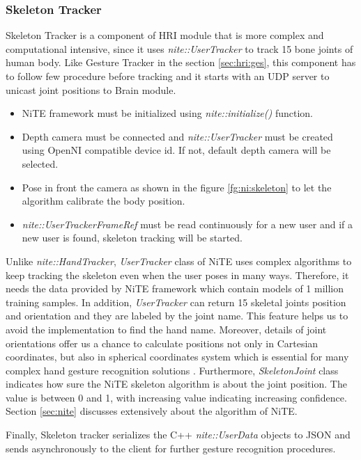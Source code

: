 \subsubsection{Skeleton Tracker} Skeleton Tracker is a component of HRI module that is more complex and computational intensive, since it uses \textit{nite::UserTracker} to track 15 bone joints of human body. Like Gesture Tracker in the section \ref{sec:hri:ges}, this component has to follow few procedure before tracking and it starts with an UDP server to unicast joint positions to Brain module. 
\begin{itemize}
	\item NiTE framework must be initialized using \textit{nite::initialize()} function. 
	\item Depth camera must be connected and \textit{nite::UserTracker} must be created using OpenNI compatible device id. If not, default depth camera will be selected. 
	\item Pose in front the camera as shown in the figure \ref{fg:ni:skeleton} to let the algorithm calibrate the body position. 
	\item \textit{nite::UserTrackerFrameRef }must be read continuously for a new user and if a new user is found, skeleton tracking will be started. 
\end{itemize}



Unlike \textit{nite::HandTracker}, \textit{UserTracker} class of NiTE uses complex algorithms to keep tracking the skeleton even when the user poses in many ways. Therefore, it needs the data provided by NiTE framework which contain models of 1 million training samples. In addition, \textit{UserTracker} can return 15 skeletal joints position and orientation and they are labeled by the joint name. This feature helps us to avoid the implementation to find the hand name. Moreover, details of joint orientations offer us a chance to calculate positions not only in Cartesian coordinates, but also in spherical coordinates system which is essential for many complex hand gesture recognition solutions \cite{21}. Furthermore, \textit{SkeletonJoint} class indicates how sure the NiTE skeleton algorithm is about the joint position. The value is between 0 and 1, with increasing value indicating increasing confidence. Section \ref{sec:nite} discusses extensively about the algorithm of NiTE.

Finally, Skeleton tracker serializes the C++ \textit{nite::UserData} objects to JSON and sends asynchronously to the client for further gesture recognition procedures. 